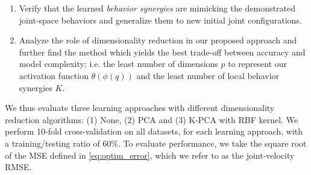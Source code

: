 \documentclass[letterpaper, 10 pt, conference,fleqn]{ieeeconf}
\begin{document}
\begin{enumerate}[leftmargin=*]
\item Verify that the learned \textit{behavior synergies} are mimicking the demonstrated joint-space behaviors and generalize them to new initial joint configurations.
\item Analyze the role of dimensionality reduction in our proposed approach and further find the method which yields the best trade-off between accuracy and model complexity; i.e. the least number of dimensions $p$ to represent our activation function $\theta(\phi(q))$ and the least number of local behavior synergies $K$.
\end{enumerate}
We thus evaluate three learning approaches with different dimensionality reduction algorithms: (1) None, (2) PCA and (3) K-PCA with RBF kernel.
We perform 10-fold cross-validation on all datasets, for each learning approach, with a training/testing ratio of $60 \%$. To evaluate performance, we take the square root of the MSE defined in \eqref{eq:optim_error}, which we refer to as the joint-velocity RMSE. 
\end{document}
